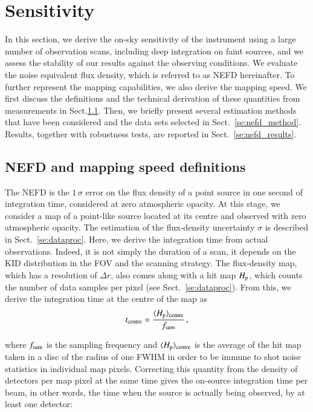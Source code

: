 \documentclass[traditionalabstract]{aa}
\begin{document}
{\section{Sensitivity}
\label{se:sensitivity}
%

In this section, we derive the on-sky sensitivity of the instrument using a
large number of observation scans, including deep integration on faint sources,
and we assess the stability of our results against the observing
conditions.
We evaluate the noise equivalent flux density, which is referred to as
NEFD hereinafter. To further represent the mapping capabilities, we also
derive the mapping speed.
We first discuss the definitions and the technical derivation of these quantities from measurements in Sect.\ref{se:integration_time}. Then, we briefly present
several estimation methods that have been considered and the data sets  selected in Sect.~\ref{se:nefd_method}. Results, together with robustness
tests, are reported in Sect.~\ref{se:nefd_results}.


\subsection{NEFD and mapping speed definitions}
\label{se:integration_time}

The NEFD is the $1\,\sigma$ error on the flux
density of a point source in one second of integration time,
considered at zero atmospheric opacity.
At this stage, we consider a map of a point-like source located at its
centre and observed with zero atmospheric opacity. The estimation of
the flux-density uncertainty $\sigma$ is described in Sect.~\ref{se:dataproc}.
Here, we derive the integration time from actual observations. Indeed,
it is not simply the duration of a scan, it depends on the KID
distribution in the FOV and the scanning strategy.
The flux-density map, which has a resolution of $\Delta r$, also comes
along with a hit map $H_{\rm{p}}$, which counts the number of
data samples per pixel (see Sect.~\ref{se:dataproc}).
From this, we derive the integration time at the centre
of the map as
\begin{equation}
t_{\rm{centre}} = \frac{\langle H_{\rm{p}}\rangle_{\rm{centre}}}{f_{\rm{sam}}}\,,
\end{equation}

where $f_{\rm{sam}}$ is the sampling frequency and $\langle
H_{\rm{p}}\rangle_{\rm{centre}}$ is the average of the hit map taken in a disc
of the radius of one FWHM in order to be immune to shot noise statistics in individual map
pixels. Correcting this quantity from the density of detectors per map pixel at
the same time gives the on-source integration time per beam, in other
words, the time when the source is actually being observed, by at least one
detector:

}
\end{document}
